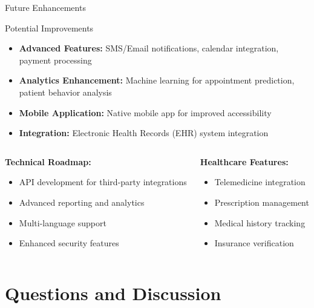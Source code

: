 \documentclass[aspectratio=169]{beamer}
\begin{document}
\begin{frame}{Future Enhancements}
\begin{block}{Potential Improvements}
\begin{itemize}
    \item \textbf{Advanced Features:} SMS/Email notifications, calendar integration, payment processing
    \item \textbf{Analytics Enhancement:} Machine learning for appointment prediction, patient behavior analysis
    \item \textbf{Mobile Application:} Native mobile app for improved accessibility
    \item \textbf{Integration:} Electronic Health Records (EHR) system integration
\end{itemize}
\end{block}

\vspace{0.5cm}

\begin{columns}
\begin{column}{0.5\textwidth}
\textbf{Technical Roadmap:}
\begin{itemize}
    \item API development for third-party integrations
    \item Advanced reporting and analytics
    \item Multi-language support
    \item Enhanced security features
\end{itemize}
\end{column}
\begin{column}{0.5\textwidth}
\textbf{Healthcare Features:}
\begin{itemize}
    \item Telemedicine integration
    \item Prescription management
    \item Medical history tracking
    \item Insurance verification
\end{itemize}
\end{column}
\end{columns}
\end{frame}

\section{Questions and Discussion}
\end{document}
